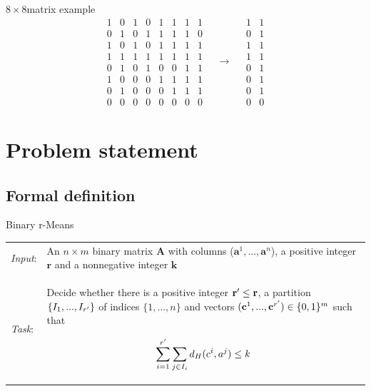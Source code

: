\documentclass{beamer}
\begin{document}
\begin{frame}
  \begin{block}{$8 \times 8$matrix example}
    \[
      \begin{matrix}
        1 & 0 & 1 & 0 & 1 & 1 & 1 & 1 \\
        0 & 1 & 0 & 1 & 1 & 1 & 1 & 0 \\
        1 & 0 & 1 & 0 & 1 & 1 & 1 & 1 \\
        1 & 1 & 1 & 1 & 1 & 1 & 1 & 1 \\
        0 & 1 & 0 & 1 & 0 & 0 & 1 & 1 \\
        1 & 0 & 0 & 0 & 1 & 1 & 1 & 1 \\
        0 & 1 & 0 & 0 & 0 & 1 & 1 & 1 \\
        0 & 0 & 0 & 0 & 0 & 0 & 0 & 0
      \end{matrix} \quad \rightarrow \quad \begin{matrix}
        1 & 1 \\
        0 & 1 \\
        1 & 1 \\
        1 & 1 \\
        0 & 1 \\
        0 & 1 \\
        0 & 1 \\
        0 & 0
      \end{matrix}
    \]
  \end{block}
\end{frame}

\section{Problem statement}

\subsection{Formal definition}
\begin{frame}
  \begin{block}{Binary r-Means}
    \begin{tabular}{p{}p{}}
      \textit{Input}: & An $n \times m$ binary matrix \textbf{A} with columns
      ($\textbf{a}^1,...,\textbf{a}^n$), a positive integer $\textbf{r}$ and a nonnegative
      integer $\textbf{k}$                                                                     \\

      \textit{Task}:  & Decide whether there is a positive integer $\textbf{r}\sp{\prime} \leq
        \textbf{r}$, a partition $\{I_1, ..., I_{r\sp{\prime}}\}$ of indices $\{1,...,n\}$ and vectors
      $(\textbf{c}^1,...,\textbf{c}^{r\sp{\prime}}) \in \{0,1\}^m$ such that

      \[
        \sum_{i = 1}^{r\sp{\prime}} \sum_{j \in I_i} d_H(c^i, a^j) \leq k
      \]
    \end{tabular}
  \end{block}
\end{frame}
\end{document}
